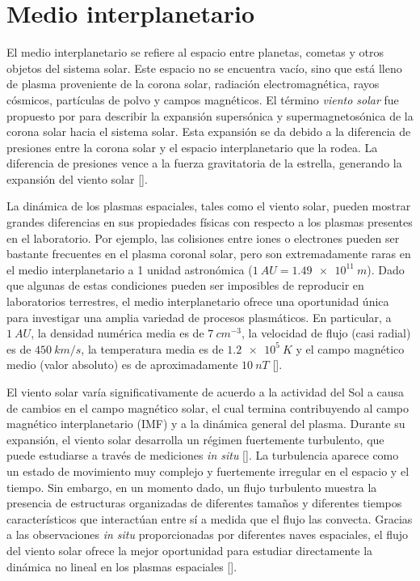 \section{Medio interplanetario}
El medio interplanetario se refiere al espacio entre planetas, cometas
y otros objetos del sistema solar. Este espacio no se encuentra vacío,
sino que está lleno de plasma proveniente de la corona solar,
radiación electromagnética, rayos cósmicos, partículas de polvo y
campos magnéticos. El término \emph{viento solar} fue propuesto por
\cite{parker_dynamics_1958} para describir la expansión supersónica
y supermagnetosónica de la corona solar hacia el sistema solar. Esta
expansión se da debido a la diferencia de presiones entre la corona
solar y el espacio interplanetario que la rodea. La diferencia de
presiones vence a la fuerza gravitatoria de la estrella, generando la
expansión del viento solar [\cite{kivelson_introduction_1995}].

La dinámica de los plasmas espaciales, tales como el viento solar,
pueden mostrar grandes diferencias en sus propiedades físicas con
respecto a los plasmas presentes en el laboratorio. Por ejemplo, las
colisiones entre iones o electrones pueden ser bastante frecuentes en
el plasma coronal solar, pero son extremadamente raras en el medio
interplanetario a 1 unidad astronómica ($\SI{1}{AU} =
\SI{1.49e11}{m}$). Dado que algunas de estas condiciones pueden ser
imposibles de reproducir en laboratorios terrestres, el medio
interplanetario ofrece una oportunidad única para investigar una
amplia variedad de procesos plasmáticos. En particular, a
$\SI{1}{AU}$, la densidad numérica media es de $\SI{7}{cm^{-3}}$, la
velocidad de flujo (casi radial) es de $\SI{450}{km/s}$, la
temperatura media es de $\SI{1.2e5}{K}$ y el campo magnético medio
(valor absoluto) es de aproximadamente $\SI{10}{nT}$
[\cite{kivelson_introduction_1995}].

El viento solar varía significativamente de acuerdo a la actividad del
Sol a causa de cambios en el campo magnético solar, el cual termina
contribuyendo al campo magnético interplanetario (IMF) y a la dinámica
general del plasma. Durante su expansión, el viento solar desarrolla
un régimen fuertemente turbulento, que puede estudiarse a través de
mediciones \emph{in situ} [\cite{matthaeus_measurement_1982}]. La
turbulencia aparece como un estado de movimiento muy complejo y
fuertemente irregular en el espacio y el tiempo. Sin embargo, en un
momento dado, un flujo turbulento muestra la presencia de estructuras
organizadas de diferentes tamaños y diferentes tiempos característicos
que interactúan entre sí a medida que el flujo las convecta. Gracias a
las observaciones \emph{in situ} proporcionadas por diferentes naves
espaciales, el flujo del viento solar ofrece la mejor oportunidad para
estudiar directamente la dinámica no lineal en los plasmas espaciales
[\cite{bruno_solar_2005}].




